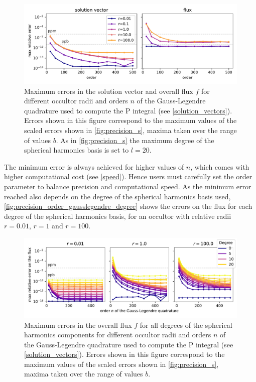 \documentclass[modern]{aastex631}
\begin{document}
\begin{figure}[H]
    \begin{center}
        \includegraphics[width=\textwidth]{../workflows/precision/figures/error_order.pdf}
        \caption{Maximum errors in the solution vector and overall flux $f$ for different occultor radii and orders $n$ of the Gauss-Legendre quadrature used to compute the P integral (see \autoref{solution_vectors}). Errors shown in this figure correspond to the maximum values of the scaled errors shown in \autoref{fig:precision_s}, maxima taken over the range of values $b$. As in \autoref{fig:precision_s} the maximum degree of the spherical harmonics basis is set to $l=20$.}
        \label{fig:precision_order_gausslegendre}
    \end{center}
\end{figure}
The minimum error is always achieved for higher values of $n$, which comes with higher computational cost (see \autoref{speed}). Hence users must carefully set the order parameter to balance precision and computational speed. As the minimum error reached also depends on the degree of the spherical harmonics basis used, \autoref{fig:precision_order_gausslegendre_degree} shows the errors on the flux for each degree of the spherical harmonics basis, for an occultor with relative radii $r=0.01$, $r=1$ and $r=100$.
\begin{figure}[H]
    \begin{center}
        \includegraphics[width=\textwidth]{../workflows/precision/figures/error_order_degree.pdf}
        \caption{Maximum errors in the overall flux $f$ for all degrees of the spherical harmonics components for different occultor radii and orders $n$ of the Gauss-Legendre quadrature used to compute the P integral (see \autoref{solution_vectors}). Errors shown in this figure correspond to the maximum values of the scaled errors shown in \autoref{fig:precision_s}, maxima taken over the range of values $b$.}
        \label{fig:precision_order_gausslegendre_degree}
    \end{center}
\end{figure}
\end{document}
